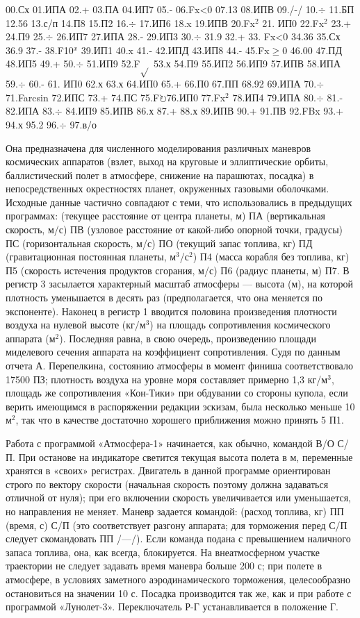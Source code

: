 \documentclass[11pt,a4paper,oneside]{article}
\def\FO{F$\circlearrowright$}
\begin{document}
00.Сх 01.ИПА 02.+ 03.ПА 04.ИП7 05.- 06.Fx<0 07.13 08.ИПВ 09./-/ 10.$\div$ 11.БП 12.56 13.с/п 14.П8 15.П2 16.$\div$ 17.ИП6 18.x 19.ИПВ 20.Fx$^{2}$ 21. ИП0 22.Fx$^{2}$ 23.+ 24.П9 25.$\div$ 26.ИП7 27.ИПА 28.- 29.ИП3 30.$\div$ 31.9 32.+ 33. Fx<0 34.36 35.Сх 36.9 37.- 38.F10$^{x}$ 39.ИП1 40.x 41.- 42.ИПД 43.ИП8 44.- 45.Fx$\geq$0 46.00 47.ПД 48.ИП5 49.+ 50.$\div$ 51.ИП9 52.F$\sqrt{}$ 53.х 54.П9 55.ИП2 56.ИП9 57.ИПВ 58.ИПА 59.$\div$ 60.- 61. ИП0 62.х 63.х 64.ИП0 65.+ 66.П0 67.ПП 68.92 69.ИПА 70.$\div$ 71.Farcsin 72.ИПС 73.+ 74.ПС 75.\FO 76.ИП0 77.Fx$^{2}$ 78.ИП4 79.ИПА 80.$\div$ 81.- 82.ИПА 83.$\div$ 84.ИП9 85.ИПВ 86.х 87.+ 88.х 89.ИПВ 90.+ 91.ПВ 92.FBx 93.+ 94.х 95.2 96.$\div$ 97.в/о

Она предназначена для численного моделирования различных маневров космических аппаратов (взлет, выход на круговые и эллиптические орбиты, баллистический полет в атмосфере, снижение на парашютах, посадка) в непосредственных окрестностях планет, окруженных газовыми оболочками. Исходные данные частично совпадают с теми, что использовались в предыдущих программах: (текущее расстояние от центра планеты, м) ПА (вертикальная скорость, м/с) ПВ (узловое расстояние от какой-либо опорной точки, градусы) ПС (горизонтальная скорость, м/с) ПО (текущий запас топлива, кг)
ПД (гравитационная постоянная планеты, м$^{3}$/с$^{2}$) П4 (масса корабля без топлива, кг) П5 (скорость истечения продуктов сгорания, м/с) П6 (радиус планеты, м) П7. В регистр 3 засылается характерный масштаб атмосферы — высота (м), на которой плотность уменьшается в десять раз (предполагается, что она меняется по экспоненте). Наконец в регистр 1 вводится половина произведения плотности воздуха на нулевой высоте (кг/м$^{3}$) на площадь сопротивления космического аппарата (м$^{2}$). Последняя равна, в свою очередь, произведению площади миделевого сечения аппарата на коэффициент сопротивления. Судя по данным отчета А. Перепелкина, состоянию атмосферы в момент финиша соответствовало 17500 ПЗ; плотность воздуха на уровне моря составляет примерно 1,3 кг/м$^{3}$, площадь же сопротивления «Кон-Тики» при обдувании со стороны купола, если верить имеющимся в распоряжении редакции эскизам, была несколько меньше 10 м$^{2}$, так что в качестве достаточно хорошего приближения можно принять 5 П1.

Работа с программой «Атмосфера-1» начинается, как обычно, командой В/О С/П. При останове на индикаторе светится текущая высота полета в м, переменные хранятся в «своих» регистрах. Двигатель в данной программе ориентирован строго по вектору скорости (начальная скорость поэтому должна задаваться отличной от нуля); при его включении скорость увеличивается или уменьшается, но направления не меняет. Маневр задается командой: (расход топлива, кг) ПП (время, с) С/П (это соответствует разгону аппарата; для торможения перед С/П следует скомандовать ПП /—/). Если команда подана с превышением наличного запаса топлива, она, как всегда, блокируется. На внеатмосферном участке траектории не следует задавать время маневра больше 200 с; при полете в атмосфере, в условиях заметного аэродинамического торможения, целесообразно остановиться на значении 10 с. Посадка производится так же, как и при работе с программой «Лунолет-3». Переключатель Р-Г устанавливается в положение Г.
\end{document}
